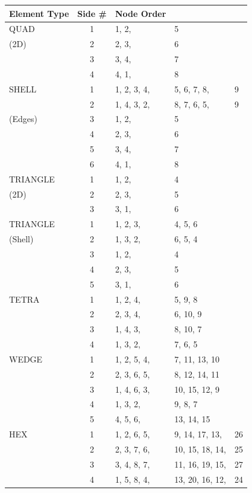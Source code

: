 \begin{table}
\begin{center}
\begin{tabular}{l|c|lll}
\hline \textbf{Element Type} & \textbf{Side \#}& \textbf{Node Order} \\ \hline
QUAD   & 1 & 1, 2, & 5 \\
(2D)   & 2 & 2, 3, & 6 \\
       & 3 & 3, 4, & 7 \\
       & 4 & 4, 1, & 8 \\ \hline
SHELL  & 1 & 1, 2, 3, 4, & 5, 6, 7, 8, & 9 \\
       & 2 & 1, 4, 3, 2, & 8, 7, 6, 5, & 9 \\
(Edges)& 3 & 1, 2, & 5 \\
       & 4 & 2, 3, & 6 \\
       & 5 & 3, 4, & 7 \\
       & 6 & 4, 1, & 8 \\ \hline
TRIANGLE&1 & 1, 2, & 4 \\
(2D)   & 2 & 2, 3, & 5 \\
       & 3 & 3, 1, & 6 \\ \hline
TRIANGLE& 1 & 1, 2, 3, & 4, 5, 6 \\
(Shell)& 2 & 1, 3, 2, & 6, 5, 4 \\
       & 3 & 1, 2,    & 4  \\
       & 4 & 2, 3,    & 5 \\
       & 5 & 3, 1,    & 6 \\ \hline
TETRA  & 1 & 1, 2, 4, & 5, 9, 8 \\
       & 2 & 2, 3, 4, & 6, 10, 9 \\
       & 3 & 1, 4, 3, & 8, 10, 7 \\
       & 4 & 1, 3, 2, & 7, 6, 5 \\ \hline
WEDGE  & 1 & 1, 2, 5, 4, & 7, 11, 13, 10 \\
       & 2 & 2, 3, 6, 5, & 8, 12, 14, 11 \\
       & 3 & 1, 4, 6, 3, & 10, 15, 12, 9 \\
       & 4 & 1, 3, 2, & 9, 8, 7 \\
       & 5 & 4, 5, 6, & 13, 14, 15 \\ \hline
HEX    & 1 & 1, 2, 6, 5, & 9, 14, 17, 13, & 26 \\
       & 2 & 2, 3, 7, 6, & 10, 15, 18, 14, & 25 \\
       & 3 & 3, 4, 8, 7, & 11, 16, 19, 15, & 27 \\
       & 4 & 1, 5, 8, 4, & 13, 20, 16, 12, & 24 \\

\end{tabular}
\end{center}
\end{table}
